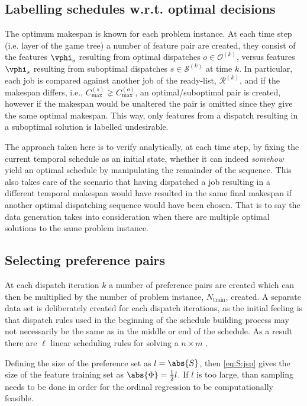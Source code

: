 \subsection{Labelling schedules w.r.t. optimal decisions}\label{sec:gentrdat:labelling}
The optimum makespan is known for each problem instance. 
At each time step (i.e. layer of the game tree) a number of feature pair are created, they consist of the features $\vphi_o$ resulting from optimal dispatches $o\in\mathcal{O}^{(k)}$, versus features $\vphi_s$ resulting from suboptimal dispatches $s\in\mathcal{S}^{(k)}$ at time $k$. 
In particular, each job is compared against another job of the ready-list, $\mathcal{R}^{(k)}$, and if the makespan differs, i.e., $C_{\max}^{(s)}\gneq C_{\max}^{(o)}$, an optimal/suboptimal pair is created, however if the makespan would be unaltered the pair is omitted since they give the same optimal makespan. This way, only features from a dispatch resulting in a suboptimal solution is labelled undesirable.

The approach taken here is to verify analytically, at each time step, by fixing the current temporal schedule as an initial state, whether it can indeed \emph{somehow} yield an optimal schedule by manipulating the remainder of the sequence. This also takes care of the scenario that having dispatched a job resulting in a different temporal makespan would have resulted in the same final makespan if another optimal dispatching sequence would have been chosen. That is to say the data generation takes into consideration when there are multiple optimal solutions to the same problem instance. 

\subsection{Selecting preference pairs}\label{sec:S:strategies}
At each dispatch iteration $k$ a number of preference pairs are created which can then be multiplied by the number of problem instance, $N_{\text{train}}$, created. A separate data set is deliberately created for each dispatch iterations, as the initial feeling is that dispatch rules used in the beginning of the schedule building process may not necessarily be the same as in the middle or end of the schedule. As a result there are $\ell$ linear scheduling rules for solving a $n \times m$ \jsp. 

Defining the size of the preference set as $l=\abs{S}$, then \cref{eq:S:jsp} gives the size of the feature training set as $\abs{\Phi}=\frac{1}{2}l$. If $l$ is too large, than sampling needs to be done in order for the ordinal regression to be computationally feasible.

